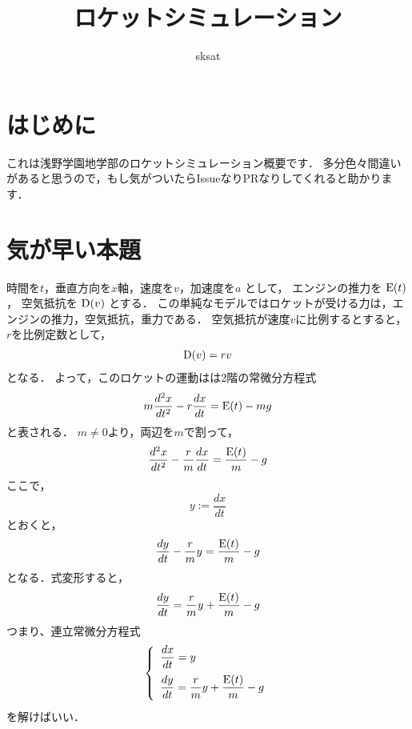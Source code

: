 \documentclass{jsarticle}
\begin{document}
%
\title{ロケットシミュレーション}
\author{sksat}
\maketitle
%
\section{はじめに}
%
これは浅野学園地学部のロケットシミュレーション概要です．
多分色々間違いがあると思うので，もし気がついたらIssueなりPRなりしてくれると助かります．
%
\section{気が早い本題}
%
時間を$t$，垂直方向を$x$軸，速度を$v$，加速度を$a$ として，
エンジンの推力を ${\rm E}(t)$，
空気抵抗を ${\rm D}(v)$ とする．
%
この単純なモデルではロケットが受ける力は，エンジンの推力，空気抵抗，重力である．
%
空気抵抗が速度$v$に比例するとすると，$r$を比例定数として，
\begin{align}
	{\rm D}(v) = r v
\end{align}
%
となる．
%
よって，このロケットの運動はは2階の常微分方程式
\begin{align}
	m \dfrac{d^2x}{dt^2} - r \dfrac{dx}{dt} = {\rm E}(t) - mg
\end{align}
%
と表される．
%
$m \neq 0$より，両辺を$m$で割って，
\begin{align}
	\dfrac{d^2x}{dt^2} - \dfrac{r}{m} \dfrac{dx}{dt} = \dfrac{{\rm E}(t)}{m} - g
\end{align}
%
ここで，
\begin{equation}
	y := \dfrac{dx}{dt}
\end{equation}
%
とおくと，
%
\begin{align}
	\dfrac{dy}{dt} - \dfrac{r}{m} y = \dfrac{{\rm E}(t)}{m} -g
\end{align}
となる．式変形すると，
\begin{align}
	\dfrac{dy}{dt} = \dfrac{r}{m} y + \dfrac{{\rm E}(t)}{m} -g
\end{align}
%
つまり、連立常微分方程式
\begin{align}
	\left\{
		\begin{array}{l}
			\dfrac{dx}{dt} = y \vspace{2mm}\\
			\dfrac{dy}{dt} = \dfrac{r}{m} y + \dfrac{{\rm E}(t)}{m} -g \vspace{1mm}
		\end{array}
	\right.
\end{align}
%
を解けばいい．
%
\end{document}
